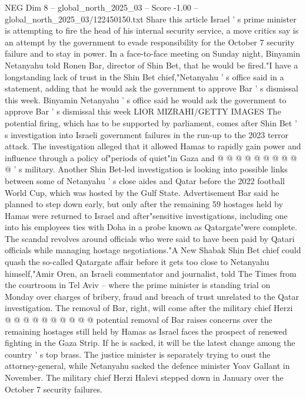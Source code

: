 \begin{textsample}{NEG Dim 8 – global\_north\_2025\_03 – Score -1.00 – global\_north\_2025\_03/122450150.txt}  \label{ex:f8_neg_365}
Share this article Israel ' s prime minister is attempting to fire the head of his internal security service, a move critics say is an attempt by the government to evade responsibility for the October 7 security failure and to stay in power.
In a face-to-face meeting on Sunday night, Binyamin Netanyahu told Ronen Bar, director of Shin Bet, that he would be fired."I have a longstanding lack of trust in the Shin Bet chief,"Netanyahu ' s office said in a statement, adding that he would ask the government to approve Bar ' s dismissal this week.
Binyamin Netanyahu ' s office said he would ask the government to approve Bar ' s dismissal this week LIOR MIZRAHI/GETTY IMAGES The potential firing, which has to be supported by parliament, comes after Shin Bet ' s investigation into Israeli government failures in the run-up to the 2023 terror attack.
The investigation alleged that it allowed Hamas to rapidly gain power and influence through a policy of"periods of quiet"in Gaza and @ @ @ @ @ @ @ @ @ @ ' s military.
Another Shin Bet-led investigation is looking into possible links between some of Netanyahu ' s close aides and Qatar before the 2022 football World Cup, which was hosted by the Gulf State.
Advertisement Bar said he planned to step down early, but only after the remaining 59 hostages held by Hamas were returned to Israel and after"sensitive investigations, including one into his employees ties with Doha in a probe known as Qatargate"were complete.
The scandal revolves around officials who were said to have been paid by Qatari officials while managing hostage negotiations."A New Shabak Shin Bet chief could quash the so-called Qatargate affair before it gets too close to Netanyahu himself,"Amir Oren, an Israeli commentator and journalist, told The Times from the courtroom in Tel Aviv -- where the prime minister is standing trial on Monday over charges of bribery, fraud and breach of trust unrelated to the Qatar investigation.
The removal of Bar, right, will come after the military chief Herzi @ @ @ @ @ @ @ @ @ @ potential removal of Bar raises concerns over the remaining hostages still held by Hamas as Israel faces the prospect of renewed fighting in the Gaza Strip.
If he is sacked, it will be the latest change among the country ' s top brass.
The justice minister is separately trying to oust the attorney-general, while Netanyahu sacked the defence minister Yoav Gallant in November.
The military chief Herzi Halevi stepped down in January over the October 7 security failures.

\end{textsample}
